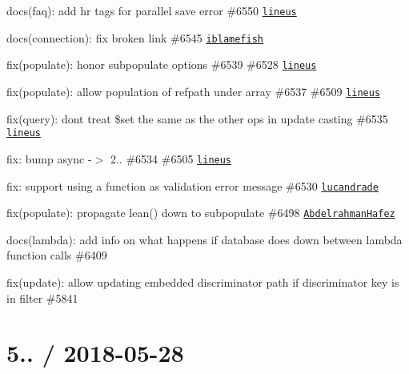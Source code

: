 \begin{DoxyItemize}
\item docs(faq)\+: add hr tags for parallel save error \#6550 \href{https://github.com/lineus}{\tt lineus}
\item docs(connection)\+: fix broken link \#6545 \href{https://github.com/iblamefish}{\tt iblamefish}
\item fix(populate)\+: honor subpopulate options \#6539 \#6528 \href{https://github.com/lineus}{\tt lineus}
\item fix(populate)\+: allow population of refpath under array \#6537 \#6509 \href{https://github.com/lineus}{\tt lineus}
\item fix(query)\+: dont treat \$set the same as the other ops in update casting \#6535 \href{https://github.com/lineus}{\tt lineus}
\item fix\+: bump async -\/$>$ 2.. \#6534 \#6505 \href{https://github.com/lineus}{\tt lineus}
\item fix\+: support using a function as validation error message \#6530 \href{https://github.com/lucandrade}{\tt lucandrade}
\item fix(populate)\+: propagate {\ttfamily lean()} down to subpopulate \#6498 \href{https://github.com/AbdelrahmanHafez}{\tt Abdelrahman\+Hafez}
\item docs(lambda)\+: add info on what happens if database does down between lambda function calls \#6409
\item fix(update)\+: allow updating embedded discriminator path if discriminator key is in filter \#5841
\end{DoxyItemize}

\section*{5.. / 2018-\/05-\/28 }


